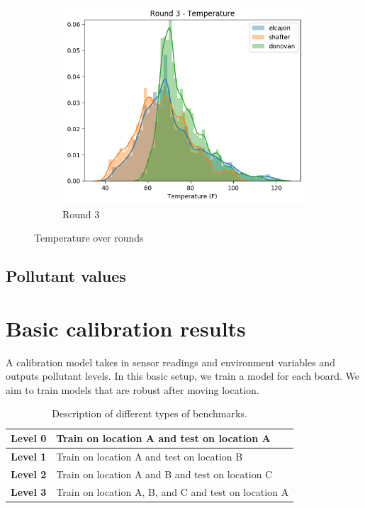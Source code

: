 \documentclass{article}
\begin{document}
\begin{figure}
\begin{subfigure}{0.32\textwidth}
\includegraphics[width=\textwidth]{results/distributions/round3_temperature.png}
\caption{Round 3}
\end{subfigure}
\caption{Temperature over rounds}
\label{fig:temperature-rounds}
\end{figure}

\subsection{Pollutant values}

\section{Basic calibration results}

A calibration model takes in sensor readings and environment
variables and outputs pollutant levels. In this basic setup,
we train a model for each board.
We aim to train models that are robust after moving location.

\begin{table}[H]
\begin{tabular}{|l|l|}
\hline
\textbf{Level 0} & Train on location A and test on location A \\ \hline
\textbf{Level 1} & Train on location A and test on location B \\ \hline
\textbf{Level 2} & Train on location A and B and test on location C \\ \hline
\textbf{Level 3} & Train on location A, B, and C and test on location A \\ \hline
\end{tabular}
\caption{Description of different types of benchmarks.}
\label{tab:levels}
\end{table}
\end{document}
